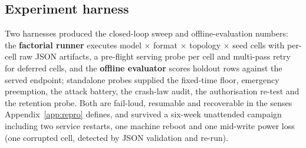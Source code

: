 \subsection{Experiment harness}\label{sec:imp-harness}
Two harnesses produced the closed-loop sweep and offline-evaluation
numbers: the \textbf{factorial runner} executes model $\times$ format
$\times$ topology $\times$ seed cells with per-cell raw JSON artifacts, a
pre-flight serving probe per cell and multi-pass retry for deferred cells,
and the \textbf{offline evaluator} scores holdout rows against the served
endpoint; standalone probes supplied the fixed-time floor, emergency
preemption, the attack battery, the crash-law audit, the authorisation
re-test and the retention probe. Both are fail-loud, resumable and
recoverable in the senses Appendix~\ref{app:repro} defines, and survived a
six-week unattended campaign including two service restarts, one machine
reboot and one mid-write power loss (one corrupted cell, detected by JSON
validation and re-run).
